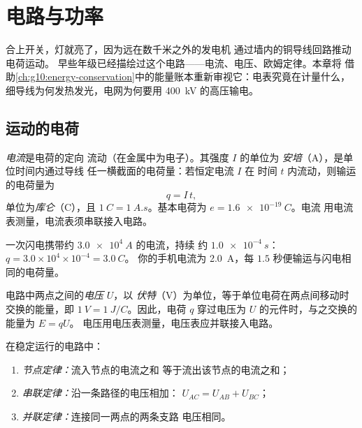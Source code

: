 \chapter{电路与功率}\label{ch:g11:circuits-and-power}

合上开关，灯就亮了，因为远在数千米之外的发电机
通过墙内的铜导线回路推动电荷运动。
早些年级已经描绘过这个电路——电流、电压、欧姆定律。本章将
借助\cref{ch:g10:energy-conservation}中的能量账本重新审视它：电表究竟在计量什么，
细导线为何发热发光，电网为何要用 \qty{400}{kV} 的高压输电。

\section{运动的电荷}

\begin{definition}[电流与库仑]\label{def:g11:circuits-and-power:current}
\emph{电流}是电荷的定向
流动（在金属中为电子）。其强度 $I$ 的单位为
\emph{安培}（\unit{A}），是单位时间内通过导线
任一横截面的电荷量：若恒定电流 $I$ 在
时间 $t$ 内流动，则输运的电荷量为
\[ q = I\,t , \]
单位为\emph{库仑}（\unit{C}），且 $\qty{1}{C} =
\qty{1}{A.s}$。基本电荷为 $e = \qty{1.6e-19}{C}$。电流
用电流表测量，电流表须串联接入电路。
\end{definition}

\begin{example}[闪电与手机]\label{ex:g11:circuits-and-power:coulomb}
一次闪电携带约 $\qty{3.0e4}{A}$ 的电流，持续
约 $\qty{1.0e-4}{s}$：$q = 3.0\times10^{4} \times 10^{-4} = \qty{3.0}{C}$。
你的手机电流为 \qty{2.0}{A}，每 $1.5$ 秒便输运与闪电相同的电荷量。
\end{example}

\begin{definition}[电压与伏特]\label{def:g11:circuits-and-power:voltage}
电路中两点之间的\emph{电压} $U$，以
\emph{伏特}（\unit{V}）为单位，等于单位电荷在两点间移动时交换的能量，即
$\qty{1}{V} = \qty{1}{J/C}$。因此，电荷
$q$ 穿过电压为 $U$ 的元件时，与之交换的能量为 $E = qU$。
电压用电压表测量，电压表应并联接入电路。
\end{definition}

\begin{proposition}[电路定律]\label{prop:g11:circuits-and-power:laws}
在稳定运行的电路中：
\begin{enumerate}
  \item \emph{节点定律：}流入节点的电流之和
        等于流出该节点的电流之和；
  \item \emph{串联定律：}沿一条路径的电压相加：
        $U_{AC} = U_{AB} + U_{BC}$；
  \item \emph{并联定律：}连接同一两点的两条支路
        电压相同。
\end{enumerate}
\end{proposition}

